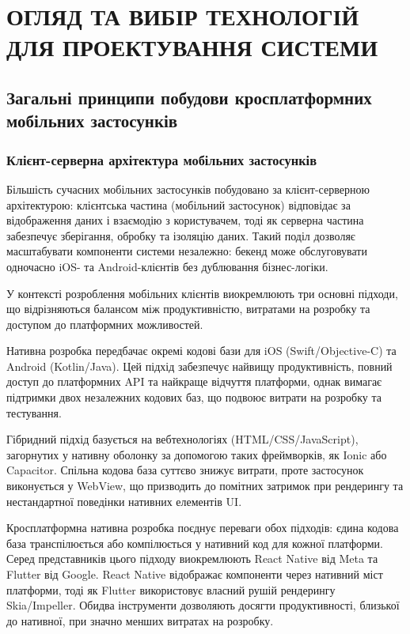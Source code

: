 
\section{ОГЛЯД ТА ВИБІР ТЕХНОЛОГІЙ ДЛЯ ПРОЕКТУВАННЯ СИСТЕМИ}

\subsection{Загальні принципи побудови кросплатформних мобільних застосунків}

\subsubsection{Клієнт-серверна архітектура мобільних застосунків}

Більшість сучасних мобільних застосунків побудовано за клієнт-серверною архітектурою: клієнтська частина (мобільний застосунок) відповідає за відображення даних і взаємодію з користувачем, тоді як серверна частина забезпечує зберігання, обробку та ізоляцію даних. Такий поділ дозволяє масштабувати компоненти системи незалежно: бекенд може обслуговувати одночасно iOS- та Android-клієнтів без дублювання бізнес-логіки.

У контексті розроблення мобільних клієнтів виокремлюють три основні підходи, що відрізняються балансом між продуктивністю, витратами на розробку та доступом до платформних можливостей.

Нативна розробка передбачає окремі кодові бази для iOS (Swift/Objective-C) та Android (Kotlin/Java). Цей підхід забезпечує найвищу продуктивність, повний доступ до платформних \gls{API} та найкраще відчуття платформи, однак вимагає підтримки двох незалежних кодових баз, що подвоює витрати на розробку та тестування.

Гібридний підхід базується на вебтехнологіях (HTML/CSS/JavaScript), загорнутих у нативну оболонку за допомогою таких фреймворків, як Ionic або Capacitor. Спільна кодова база суттєво знижує витрати, проте застосунок виконується у WebView, що призводить до помітних затримок при рендерингу та нестандартної поведінки нативних елементів \gls{UI}.

Кросплатформна нативна розробка поєднує переваги обох підходів: єдина кодова база транспілюється або компілюється у нативний код для кожної платформи. Серед представників цього підходу виокремлюють React Native від Meta та Flutter від Google. React Native відображає компоненти через нативний міст платформи, тоді як Flutter використовує власний рушій рендерингу Skia/Impeller. Обидва інструменти дозволяють досягти продуктивності, близької до нативної, при значно менших витратах на розробку.

